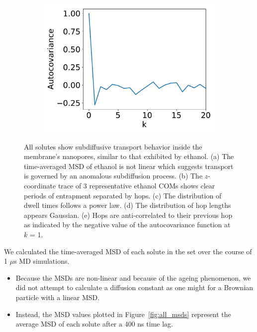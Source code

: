 \documentclass{article}
\begin{document}
\begin{figure}
\begin{subfigure}{0.325\textwidth}
  \includegraphics[width=\linewidth]{example_autocovariance.pdf}
  \caption{}\label{fig:example_autocovariance}
  \end{subfigure}
  \caption{All solutes show subdiffusive transport behavior inside the membrane's
  nanopores, similar to that exhibited by ethanol. (a) The time-averaged MSD of 
  ethanol is not linear which suggests transport is governed by an anomalous 
  subdiffusion process. (b) The $z$-coordinate trace of 3 representative ethanol
  COMs shows clear periods of entrapment separated by hops. (c) The distribution
  of dwell times follows a power law. (d) The distribution of hop lengths appears
  Gaussian. (e) Hops are anti-correlated to their previous hop as indicated by the
  negative value of the autocovariance function at $k$ = 1.}\label{fig:examples}
  \end{figure}
  
  \noindent We calculated the time-averaged MSD of each solute in the set over the
  course of 1 $\mu$s MD simulations. 
  \begin{itemize}
    \item Because the MSDs are non-linear and because of the ageing phenomenon, we
    did not attempt to calculate a diffusion constant as one might for a Brownian
    particle with a linear MSD.
	\item Instead, the MSD values plotted in Figure~\ref{fig:all_msds} represent the
	average MSD of each solute after a 400 ns time lag.
  \end{itemize}  
  
\end{document}
